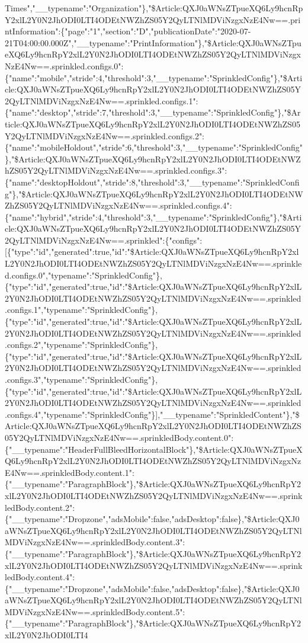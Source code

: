 Times","\_\_typename":"Organization"\},"\$Article:QXJ0aWNsZTpueXQ6Ly9hcnRpY2xlL2Y0N2JhODI0LTI4ODEtNWZhZS05Y2QyLTNlMDViNzgxNzE4Nw==.printInformation":\{"page":"1","section":"D","publicationDate":"2020-07-21T04:00:00.000Z","\_\_typename":"PrintInformation"\},"\$Article:QXJ0aWNsZTpueXQ6Ly9hcnRpY2xlL2Y0N2JhODI0LTI4ODEtNWZhZS05Y2QyLTNlMDViNzgxNzE4Nw==.sprinkled.configs.0":\{"name":"mobile","stride":4,"threshold":3,"\_\_typename":"SprinkledConfig"\},"\$Article:QXJ0aWNsZTpueXQ6Ly9hcnRpY2xlL2Y0N2JhODI0LTI4ODEtNWZhZS05Y2QyLTNlMDViNzgxNzE4Nw==.sprinkled.configs.1":\{"name":"desktop","stride":7,"threshold":3,"\_\_typename":"SprinkledConfig"\},"\$Article:QXJ0aWNsZTpueXQ6Ly9hcnRpY2xlL2Y0N2JhODI0LTI4ODEtNWZhZS05Y2QyLTNlMDViNzgxNzE4Nw==.sprinkled.configs.2":\{"name":"mobileHoldout","stride":6,"threshold":3,"\_\_typename":"SprinkledConfig"\},"\$Article:QXJ0aWNsZTpueXQ6Ly9hcnRpY2xlL2Y0N2JhODI0LTI4ODEtNWZhZS05Y2QyLTNlMDViNzgxNzE4Nw==.sprinkled.configs.3":\{"name":"desktopHoldout","stride":8,"threshold":3,"\_\_typename":"SprinkledConfig"\},"\$Article:QXJ0aWNsZTpueXQ6Ly9hcnRpY2xlL2Y0N2JhODI0LTI4ODEtNWZhZS05Y2QyLTNlMDViNzgxNzE4Nw==.sprinkled.configs.4":\{"name":"hybrid","stride":4,"threshold":3,"\_\_typename":"SprinkledConfig"\},"\$Article:QXJ0aWNsZTpueXQ6Ly9hcnRpY2xlL2Y0N2JhODI0LTI4ODEtNWZhZS05Y2QyLTNlMDViNzgxNzE4Nw==.sprinkled":\{"configs":{[}\{"type":"id","generated":true,"id":"\$Article:QXJ0aWNsZTpueXQ6Ly9hcnRpY2xlL2Y0N2JhODI0LTI4ODEtNWZhZS05Y2QyLTNlMDViNzgxNzE4Nw==.sprinkled.configs.0","typename":"SprinkledConfig"\},\{"type":"id","generated":true,"id":"\$Article:QXJ0aWNsZTpueXQ6Ly9hcnRpY2xlL2Y0N2JhODI0LTI4ODEtNWZhZS05Y2QyLTNlMDViNzgxNzE4Nw==.sprinkled.configs.1","typename":"SprinkledConfig"\},\{"type":"id","generated":true,"id":"\$Article:QXJ0aWNsZTpueXQ6Ly9hcnRpY2xlL2Y0N2JhODI0LTI4ODEtNWZhZS05Y2QyLTNlMDViNzgxNzE4Nw==.sprinkled.configs.2","typename":"SprinkledConfig"\},\{"type":"id","generated":true,"id":"\$Article:QXJ0aWNsZTpueXQ6Ly9hcnRpY2xlL2Y0N2JhODI0LTI4ODEtNWZhZS05Y2QyLTNlMDViNzgxNzE4Nw==.sprinkled.configs.3","typename":"SprinkledConfig"\},\{"type":"id","generated":true,"id":"\$Article:QXJ0aWNsZTpueXQ6Ly9hcnRpY2xlL2Y0N2JhODI0LTI4ODEtNWZhZS05Y2QyLTNlMDViNzgxNzE4Nw==.sprinkled.configs.4","typename":"SprinkledConfig"\}{]},"\_\_typename":"SprinkledContent"\},"\$Article:QXJ0aWNsZTpueXQ6Ly9hcnRpY2xlL2Y0N2JhODI0LTI4ODEtNWZhZS05Y2QyLTNlMDViNzgxNzE4Nw==.sprinkledBody.content.0":\{"\_\_typename":"HeaderFullBleedHorizontalBlock"\},"\$Article:QXJ0aWNsZTpueXQ6Ly9hcnRpY2xlL2Y0N2JhODI0LTI4ODEtNWZhZS05Y2QyLTNlMDViNzgxNzE4Nw==.sprinkledBody.content.1":\{"\_\_typename":"ParagraphBlock"\},"\$Article:QXJ0aWNsZTpueXQ6Ly9hcnRpY2xlL2Y0N2JhODI0LTI4ODEtNWZhZS05Y2QyLTNlMDViNzgxNzE4Nw==.sprinkledBody.content.2":\{"\_\_typename":"Dropzone","adsMobile":false,"adsDesktop":false\},"\$Article:QXJ0aWNsZTpueXQ6Ly9hcnRpY2xlL2Y0N2JhODI0LTI4ODEtNWZhZS05Y2QyLTNlMDViNzgxNzE4Nw==.sprinkledBody.content.3":\{"\_\_typename":"ParagraphBlock"\},"\$Article:QXJ0aWNsZTpueXQ6Ly9hcnRpY2xlL2Y0N2JhODI0LTI4ODEtNWZhZS05Y2QyLTNlMDViNzgxNzE4Nw==.sprinkledBody.content.4":\{"\_\_typename":"Dropzone","adsMobile":false,"adsDesktop":false\},"\$Article:QXJ0aWNsZTpueXQ6Ly9hcnRpY2xlL2Y0N2JhODI0LTI4ODEtNWZhZS05Y2QyLTNlMDViNzgxNzE4Nw==.sprinkledBody.content.5":\{"\_\_typename":"ParagraphBlock"\},"\$Article:QXJ0aWNsZTpueXQ6Ly9hcnRpY2xlL2Y0N2JhODI0LTI4